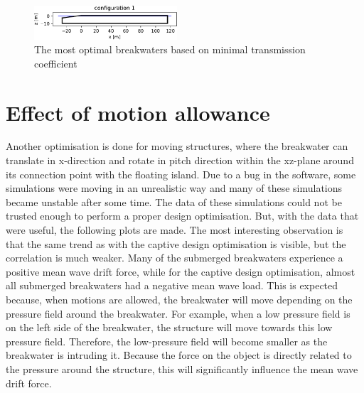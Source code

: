 \begin{figure}[h]
    \centering
    \includegraphics[width=0.475\textwidth]{figures/ComFLOW/Breakwater Geometries/Design Iteration 1 captive/DI1-WC2 captive/breakwater_geometry1_Kt.pdf}
    \caption{The most optimal breakwaters based on minimal transmission coefficient}
    \label{fig:  most optimal breakwaters DI2}
\end{figure}




\section{Effect of motion allowance}
Another optimisation is done for moving structures, where the breakwater can translate in x-direction and rotate in pitch direction within the xz-plane around its connection point with the floating island. Due to a bug in the software, some simulations were moving in an unrealistic way and many of these simulations became unstable after some time. The data of these simulations could not be trusted enough to perform a proper design optimisation. But, with the data that were useful, the following plots are made. The most interesting observation is that the same trend as with the captive design optimisation is visible, but the correlation is much weaker. Many of the submerged breakwaters experience a positive mean wave drift force, while for the captive design optimisation, almost all submerged breakwaters had a negative mean wave load. This is expected because, when motions are allowed, the breakwater will move depending on the pressure field around the breakwater. For example, when a low pressure field is on the left side of the breakwater, the structure will move towards this low pressure field. Therefore, the low-pressure field will become smaller as the breakwater is intruding it. Because the force on the object is directly related to the pressure around the structure, this will significantly influence the mean wave drift force.

